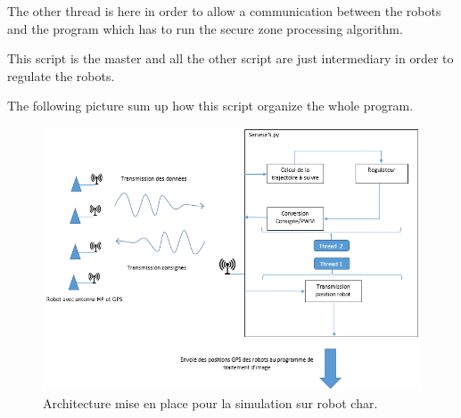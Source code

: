 The other thread is here in order to allow a communication between the robots and the program which has to run the secure zone processing algorithm.

This script is the master and all the other script are just intermediary in order to regulate the robots. 

The following picture sum up how this script organize the whole program.

\begin{figure}[ht]
\centering
    \includegraphics[scale=0.8,angle=0]{SyntheseExp.PNG}
    \caption{Architecture mise en place pour la simulation sur robot char.}
    \label{fig:SyntheseExp}
\end{figure}

\pagebreak